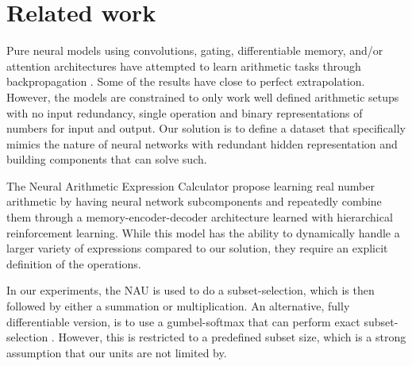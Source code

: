 \section{Related work}
Pure neural models using convolutions, gating, differentiable memory, and/or attention architectures have attempted to learn arithmetic tasks through backpropagation \cite{NeuralGPU,GridLSTM,NTM,FreivaldsL17}.
Some of the results have close to perfect extrapolation. However, the models are constrained to only work well defined arithmetic setups with no input redundancy, single operation and binary representations of numbers for input and output.
Our solution is to define a dataset that specifically mimics the nature of neural networks with redundant hidden representation and building components that can solve such.

The Neural Arithmetic Expression Calculator \cite{NAEC} propose learning real number arithmetic by having neural network subcomponents and repeatedly combine them through a memory-encoder-decoder architecture learned with hierarchical reinforcement learning.
While this model has the ability to dynamically handle a larger variety of expressions compared to our solution, they require an explicit definition of the operations.

In our experiments, the NAU is used to do a subset-selection, which is then followed by either a summation or multiplication.
An alternative, fully differentiable version, is to use a gumbel-softmax that can perform exact subset-selection \cite{DSS}.
However, this is restricted to a predefined subset size, which is a strong assumption that our units are not limited by.